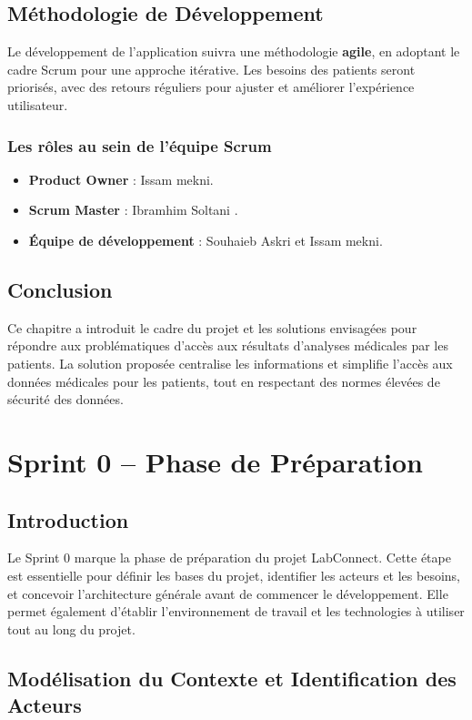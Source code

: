 \documentclass[12pt,a4paper]{report}
\begin{document}
\section{Méthodologie de Développement}
Le développement de l'application suivra une méthodologie \textbf{agile}, en adoptant le cadre Scrum pour une approche itérative. Les besoins des patients seront priorisés, avec des retours réguliers pour ajuster et améliorer l'expérience utilisateur.

\subsection{Les rôles au sein de l'équipe Scrum}
\begin{itemize}
    \item \textbf{Product Owner} : Issam mekni.
    \item \textbf{Scrum Master} : Ibramhim Soltani .
    \item \textbf{Équipe de développement} : Souhaieb Askri et Issam mekni.
\end{itemize}


\section{Conclusion}
Ce chapitre a introduit le cadre du projet et les solutions envisagées pour répondre aux problématiques d'accès aux résultats d'analyses médicales par les patients. La solution proposée centralise les informations et simplifie l'accès aux données médicales pour les patients, tout en respectant des normes élevées de sécurité des données.


\chapter{Sprint 0 – Phase de Préparation}

\section{Introduction}
Le Sprint 0 marque la phase de préparation du projet LabConnect. Cette étape est essentielle pour définir les bases du projet, identifier les acteurs et les besoins, et concevoir l'architecture générale avant de commencer le développement. Elle permet également d'établir l'environnement de travail et les technologies à utiliser tout au long du projet.

\section{Modélisation du Contexte et Identification des Acteurs}
\end{document}
